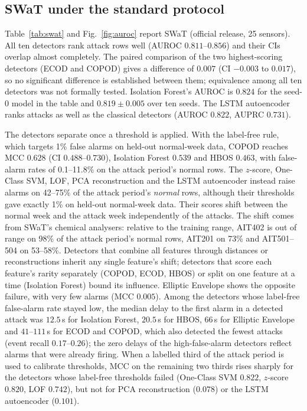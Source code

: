 \documentclass[11pt]{article}
\begin{document}
\subsection{SWaT under the standard protocol}
Table~\ref{tab:swat} and Fig.~\ref{fig:auroc} report SWaT (official release, 25
sensors). All ten detectors rank attack rows well (AUROC $0.811$--$0.856$) and their
CIs overlap almost completely. The paired comparison of the two highest-scoring detectors
(ECOD and COPOD) gives a difference of $0.007$ (CI $-0.003$ to $0.017$), so no significant
difference is established between them; equivalence among all ten detectors was not
formally tested. Isolation Forest's AUROC is $0.824$ for the seed-0
model in the table and $0.819\pm0.005$ over ten seeds. The LSTM autoencoder ranks attacks as well as the classical detectors
(AUROC $0.822$, AUPRC $0.731$).

The detectors separate once a threshold is applied. With the label-free rule, which
targets 1\% false alarms on held-out normal-week data, COPOD reaches MCC $0.628$ (CI
$0.488$--$0.730$), Isolation Forest $0.539$ and HBOS $0.463$, with false-alarm rates of
0.1--11.8\% on the attack period's normal rows. The $z$-score, One-Class SVM, LOF, PCA
reconstruction and the LSTM autoencoder instead raise alarms on 42--75\% of the attack
period's \emph{normal} rows, although their thresholds gave exactly 1\% on held-out
normal-week data. Their scores shift between the normal week and the attack week
independently of the attacks. The shift comes from SWaT's chemical analysers: relative
to the training range, AIT402 is out of range on 98\% of the attack period's normal
rows, AIT201 on 73\% and AIT501--504 on 53--58\%. Detectors that combine all features
through distances or reconstructions inherit any single feature's shift; detectors that
score each feature's rarity separately (COPOD, ECOD, HBOS) or split on one feature at a
time (Isolation Forest) bound its influence. Elliptic Envelope shows the opposite failure,
with very few alarms (MCC $0.005$). Among the detectors whose label-free false-alarm rate stayed low, the
median delay to the first alarm in a detected attack was $12.5$\,s for Isolation Forest,
$20.5$\,s for HBOS, $66$\,s for Elliptic Envelope and $41$--$111$\,s for ECOD and COPOD, which also detected the fewest
attacks (event recall $0.17$--$0.26$); the zero delays of the high-false-alarm detectors
reflect alarms that were already firing. When a labelled third of the attack period is used to
calibrate thresholds, MCC on the remaining two thirds rises sharply for the detectors
whose label-free thresholds failed (One-Class SVM $0.822$, $z$-score $0.820$, LOF
$0.742$), but not for PCA reconstruction ($0.078$) or the LSTM autoencoder ($0.101$).
\end{document}

